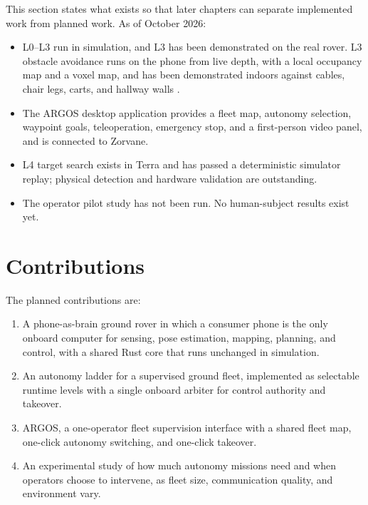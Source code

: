 This section states what exists so that later chapters can separate implemented work from planned work.
As of October 2026:

\begin{itemize}
\item L0--L3 run in simulation, and L3 has been demonstrated on the real rover.
  L3 obstacle avoidance runs on the phone from live depth, with a local occupancy map and a voxel map, and has been demonstrated indoors against cables, chair legs, carts, and hallway walls .
\item The ARGOS desktop application provides a fleet map, autonomy selection, waypoint goals, teleoperation, emergency stop, and a first-person video panel, and is connected to Zorvane.
\item L4 target search exists in Terra and has passed a deterministic simulator replay; physical detection and hardware validation are outstanding.
\item The operator pilot study has not been run.
  No human-subject results exist yet.
\end{itemize}

\section*{Contributions}

The planned contributions are:

\begin{enumerate}
\item A phone-as-brain ground rover in which a consumer phone is the only onboard computer for sensing, pose estimation, mapping, planning, and control, with a shared Rust core that runs unchanged in simulation.
\item An autonomy ladder for a supervised ground fleet, implemented as selectable runtime levels with a single onboard arbiter for control authority and takeover.
\item ARGOS, a one-operator fleet supervision interface with a shared fleet map, one-click autonomy switching, and one-click takeover.
\item An experimental study of how much autonomy missions need and when operators choose to intervene, as fleet size, communication quality, and environment vary.
\end{enumerate}

